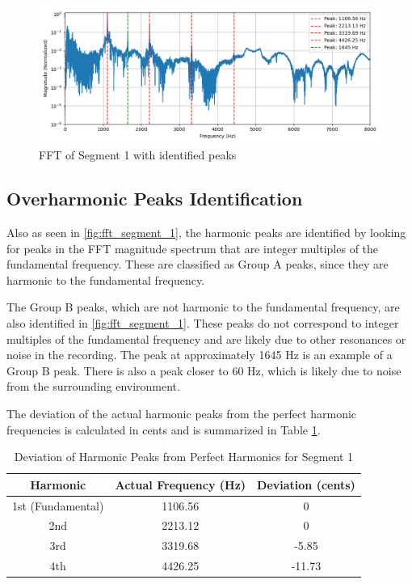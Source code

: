 \begin{figure}[H]
    \centering
    \includegraphics[width=\textwidth]{data/fft_spectrums/fft_spectrum_segment_1.png}
    \caption{FFT of Segment 1 with identified peaks}
    \label{fig:fft_segment_1}
\end{figure}

\subsection{Overharmonic Peaks Identification}

Also as seen in \autoref{fig:fft_segment_1}, the harmonic peaks are identified by looking for peaks in the FFT magnitude spectrum that are integer multiples of the fundamental frequency. These are classified as Group A peaks, since they are harmonic to the fundamental frequency. 

The Group B peaks, which are not harmonic to the fundamental frequency, are also identified in \autoref{fig:fft_segment_1}. These peaks do not correspond to integer multiples of the fundamental frequency and are likely due to other resonances or noise in the recording. The peak at approximately 1645 Hz is an example of a Group B peak. There is also a peak closer to 60 Hz, which is likely due to noise from the surrounding environment.

The deviation of the actual harmonic peaks from the perfect harmonic frequencies is calculated in cents and is summarized in Table \ref{tab:deviation_segment_1}. 

\begin{table}[H]
    \centering
    \caption{Deviation of Harmonic Peaks from Perfect Harmonics for Segment 1}
    \begin{tabular}{ccc}
        \hline
        Harmonic & Actual Frequency (Hz) & Deviation (cents) \\
        \hline
        1st (Fundamental) & 1106.56 & 0 \\
        2nd & 2213.12 & 0 \\
        3rd & 3319.68 & -5.85 \\
        4th & 4426.25 & -11.73 \\
        \hline
    \end{tabular}
    \label{tab:deviation_segment_1}
\end{table}

